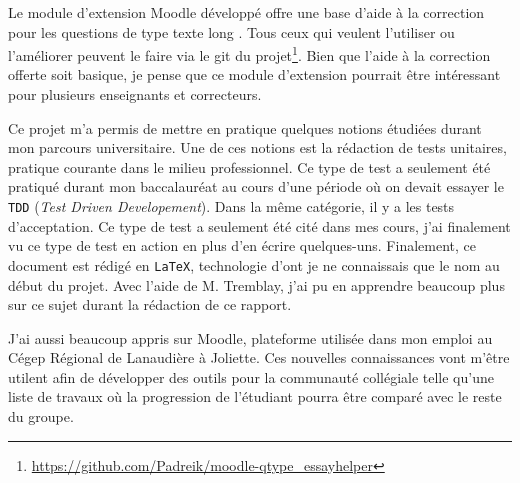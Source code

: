 \begin{conclusion}
Le module d'extension Moodle d\'evelopp\'e offre une base d'aide \`a la correction pour les questions de type \og texte long \fg{}.
Tous ceux qui veulent l'utiliser ou l'am\'eliorer peuvent le faire via le git du projet\footnote{\url{https://github.com/Padreik/moodle-qtype_essayhelper}}.
Bien que l'aide \`a la correction offerte soit basique, je pense que ce module d'extension pourrait \^etre int\'eressant pour plusieurs enseignants et correcteurs.

Ce projet m'a permis de mettre en pratique quelques notions \'etudi\'ees durant mon parcours universitaire.
Une de ces notions est la r\'edaction de tests unitaires, pratique courante dans le milieu professionnel.
Ce type de test a seulement \'et\'e pratiqu\'e durant mon baccalaur\'eat au cours d'une p\'eriode o\`u on devait essayer le \texttt{TDD} (\textit{Test Driven Developement}).
Dans la m\^eme cat\'egorie, il y a les tests d'acceptation.
Ce type de test a seulement \'et\'e cit\'e dans mes cours, j'ai finalement vu ce type de test en action en plus d'en \'ecrire quelques-uns.
Finalement, ce document est r\'edig\'e en \texttt{LaTeX}, technologie d'ont je ne connaissais que le nom au d\'ebut du projet.
Avec l'aide de M. Tremblay, j'ai pu en apprendre beaucoup plus sur ce sujet durant la r\'edaction de ce rapport.

J'ai aussi beaucoup appris sur Moodle, plateforme utilis\'ee dans mon emploi au C\'egep R\'egional de Lanaudi\`ere \`a Joliette.
Ces nouvelles connaissances vont m'\^etre utilent afin de d\'evelopper des outils pour la communaut\'e coll\'egiale telle qu'une liste de travaux o\`u la progression de l'\'etudiant pourra \^etre compar\'e avec le reste du groupe.


\end{conclusion}
